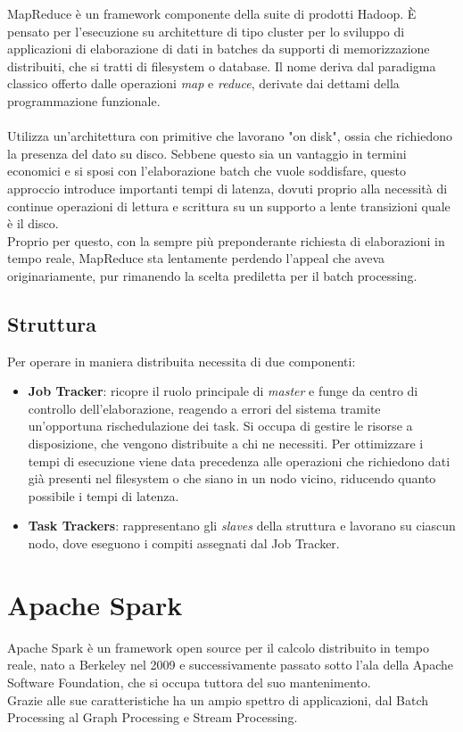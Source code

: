 MapReduce \cite{hadoop_doc} è un framework componente della suite di prodotti Hadoop. È pensato per l'esecuzione su architetture di tipo cluster per lo sviluppo di applicazioni di elaborazione di dati in batches da supporti di memorizzazione distribuiti, che si tratti di filesystem o database. Il nome deriva dal paradigma classico offerto dalle operazioni \textit{map} e \textit{reduce}, derivate dai dettami della programmazione funzionale.\\\\
Utilizza un'architettura con primitive che lavorano "on disk", ossia che richiedono la presenza del dato su disco. Sebbene questo sia un vantaggio in termini economici e si sposi con l'elaborazione batch che vuole soddisfare, questo approccio introduce importanti tempi di latenza, dovuti proprio alla necessità di continue operazioni di lettura e scrittura su un supporto a lente transizioni quale è il disco.\\ 
Proprio per questo, con la sempre più preponderante richiesta di elaborazioni in tempo reale, MapReduce sta lentamente perdendo l'appeal che aveva originariamente, pur rimanendo la scelta prediletta per il batch processing.

\subsection{Struttura}
Per operare in maniera distribuita necessita di due componenti:
\begin{itemize}
	\item \textbf{Job Tracker}: ricopre il ruolo principale di \textit{master} e funge da centro di controllo dell'elaborazione, reagendo a errori del sistema tramite un'opportuna rischedulazione dei task. Si occupa di gestire le risorse a disposizione, che vengono distribuite a chi ne necessiti. Per ottimizzare i tempi di esecuzione viene data precedenza alle operazioni che richiedono dati già presenti nel filesystem o che siano in un nodo vicino, riducendo quanto possibile i tempi di latenza. 
	
	\item \textbf{Task Trackers}: rappresentano gli \textit{slaves} della struttura e lavorano su ciascun nodo, dove eseguono i compiti assegnati dal Job Tracker.
\end{itemize}

\pagebreak

\section{Apache Spark}
Apache Spark \cite{spark_doc} è un framework open source per il calcolo distribuito in tempo reale, nato a Berkeley nel 2009 e successivamente passato sotto l'ala della Apache Software Foundation, che si occupa tuttora del suo mantenimento.\\ Grazie alle sue caratteristiche ha un ampio spettro di applicazioni, dal Batch Processing al Graph Processing e Stream Processing.

